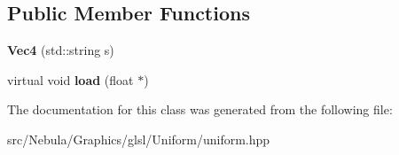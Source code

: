 \subsection*{\-Public \-Member \-Functions}
\begin{DoxyCompactItemize}
\item 
\hypertarget{classNeb_1_1glsl_1_1Uniform_1_1Scalar_1_1Vec4_a1e9c061fa7bf37160ecaa5cbb147ddcb}{{\bfseries \-Vec4} (std\-::string s)}\label{classNeb_1_1glsl_1_1Uniform_1_1Scalar_1_1Vec4_a1e9c061fa7bf37160ecaa5cbb147ddcb}

\item 
\hypertarget{classNeb_1_1glsl_1_1Uniform_1_1Scalar_1_1Vec4_a65253513c6bfea1ffcce63a654d9e45e}{virtual void {\bfseries load} (float $\ast$)}\label{classNeb_1_1glsl_1_1Uniform_1_1Scalar_1_1Vec4_a65253513c6bfea1ffcce63a654d9e45e}

\end{DoxyCompactItemize}


\-The documentation for this class was generated from the following file\-:\begin{DoxyCompactItemize}
\item 
src/\-Nebula/\-Graphics/glsl/\-Uniform/uniform.\-hpp\end{DoxyCompactItemize}
